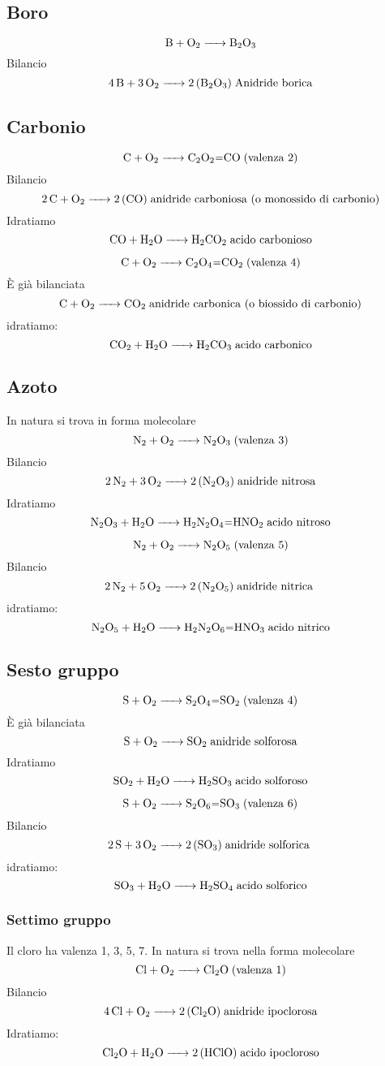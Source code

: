 \subsection{Boro}
$$\ce{B + O_2 -> B_2O_3}$$
Bilancio
$$\ce{4 B + 3 O_2 -> 2 (B_2O_3)} \; \text{Anidride borica}$$
\subsection{Carbonio}
$$\ce{C + O_2 -> C_2O_2=CO} \; \text{(valenza 2)}$$ Bilancio
$$\ce{2 C + O_2 -> 2 (CO)} \; \text{anidride carboniosa (o monossido di carbonio)}$$
Idratiamo
$$\ce{CO + H_2O -> H_2CO_2} \; \text{acido carbonioso}$$

$$\ce{C + O_2 -> C_2O_4=CO_2} \; \text{(valenza 4)}$$ È già bilanciata
$$\ce{C + O_2 -> CO_2} \; \text{anidride carbonica (o biossido di carbonio)}$$
idratiamo:
$$\ce{CO_2 + H_2O -> H_2CO_3} \; \text{acido carbonico}$$
\subsection{Azoto}
In natura si trova in forma molecolare 
$$\ce{N_2 + O_2 -> N_2O_3} \; \text{(valenza 3)}$$ Bilancio
$$\ce{2 N_2 + 3 O_2 -> 2 (N_2O_3)} \; \text{anidride nitrosa}$$
Idratiamo
$$\ce{N_2O_3 + H_2O -> H_2N_2O_4=HNO_2} \; \text{acido nitroso}$$

$$\ce{N_2 + O_2 -> N_2O_5} \; \text{(valenza 5)}$$ Bilancio
$$\ce{2 N_2 + 5 O_2 -> 2 (N_2O_5)} \; \text{anidride nitrica }$$
idratiamo:
$$\ce{N_2O_5 + H_2O -> H_2N_2O_6=HNO_3} \; \text{acido nitrico}$$
\subsection{Sesto gruppo}
$$\ce{S + O_2 -> S_2O_4=SO_2} \; \text{(valenza 4)}$$ È già bilanciata
$$\ce{S + O_2 -> SO_2} \; \text{anidride solforosa}$$
Idratiamo
$$\ce{SO_2 + H_2O -> H_2SO_3} \; \text{acido solforoso}$$

$$\ce{S + O_2 -> S_2O_6=SO_3} \; \text{(valenza 6)}$$ Bilancio
$$\ce{2 S + 3 O_2 -> 2 (SO_3)} \; \text{anidride solforica }$$
idratiamo:
$$\ce{SO_3 + H_2O -> H_2SO_4} \; \text{acido solforico}$$
\subsubsection{Settimo gruppo}
Il cloro ha valenza 1, 3, 5, 7. In natura si trova nella forma molecolare 
$$\ce{Cl + O_2 -> Cl_2O} \; \text{(valenza 1)}$$ Bilancio
$$\ce{4 Cl + O_2 -> 2 (Cl_2O)} \; \text{anidride ipoclorosa}$$
Idratiamo:
$$\ce{Cl_2O + H_2O -> 2 (HClO)} \; \text{acido ipocloroso}$$

